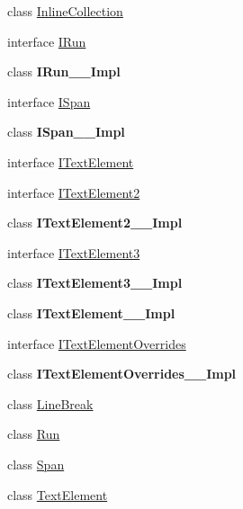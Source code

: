 \begin{DoxyCompactItemize}
\item 
class \hyperlink{class_windows_1_1_u_i_1_1_xaml_1_1_documents_1_1_inline_collection}{Inline\+Collection}
\item 
interface \hyperlink{interface_windows_1_1_u_i_1_1_xaml_1_1_documents_1_1_i_run}{I\+Run}
\item 
class {\bfseries I\+Run\+\_\+\+\_\+\+Impl}
\item 
interface \hyperlink{interface_windows_1_1_u_i_1_1_xaml_1_1_documents_1_1_i_span}{I\+Span}
\item 
class {\bfseries I\+Span\+\_\+\+\_\+\+Impl}
\item 
interface \hyperlink{interface_windows_1_1_u_i_1_1_xaml_1_1_documents_1_1_i_text_element}{I\+Text\+Element}
\item 
interface \hyperlink{interface_windows_1_1_u_i_1_1_xaml_1_1_documents_1_1_i_text_element2}{I\+Text\+Element2}
\item 
class {\bfseries I\+Text\+Element2\+\_\+\+\_\+\+Impl}
\item 
interface \hyperlink{interface_windows_1_1_u_i_1_1_xaml_1_1_documents_1_1_i_text_element3}{I\+Text\+Element3}
\item 
class {\bfseries I\+Text\+Element3\+\_\+\+\_\+\+Impl}
\item 
class {\bfseries I\+Text\+Element\+\_\+\+\_\+\+Impl}
\item 
interface \hyperlink{interface_windows_1_1_u_i_1_1_xaml_1_1_documents_1_1_i_text_element_overrides}{I\+Text\+Element\+Overrides}
\item 
class {\bfseries I\+Text\+Element\+Overrides\+\_\+\+\_\+\+Impl}
\item 
class \hyperlink{class_windows_1_1_u_i_1_1_xaml_1_1_documents_1_1_line_break}{Line\+Break}
\item 
class \hyperlink{class_windows_1_1_u_i_1_1_xaml_1_1_documents_1_1_run}{Run}
\item 
class \hyperlink{class_windows_1_1_u_i_1_1_xaml_1_1_documents_1_1_span}{Span}
\item 
class \hyperlink{class_windows_1_1_u_i_1_1_xaml_1_1_documents_1_1_text_element}{Text\+Element}
\end{DoxyCompactItemize}
